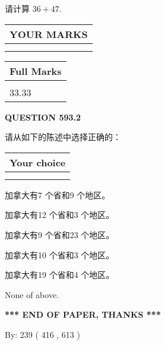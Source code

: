 \documentclass{ctexart}
\begin{document}
  
 
请计算 $ %
36 +  %
47 $.
 

 

 
  
\vspace{0.2in}
  
\noindent\begin{tabular}{|l|}
\hline
 YOUR MARKS  \\
\hline
 \\ 
 \\ 
\hline
\end{tabular}
\hspace{0.05in} \begin{tabular}{|l|}
\hline
 Full Marks  \\
\hline
 \\ 
33.33 \\
\hline
\end{tabular}
{\textbf{\Large{QUESTION
593.2 
}}}
  
  
请从如下的陈述中选择正确的：
  
  
\noindent\hspace{3.0in} \begin{tabular}{|l|}
\hline
Your choice \\
\hline
 \\ 
 \\ 
\hline
\end{tabular}
  
  
 
 
加拿大有7 个省和9 个地区。
 
 
加拿大有12 个省和3 个地区。
 
 
加拿大有9 个省和23 个地区。
 
 
加拿大有10 个省和3 个地区。
 
 
加拿大有19 个省和4 个地区。
 
 
 None of above.
 
 
   
   
 \vspace{0.2in}
 
   
   
   
   
\vspace{1.0in} 
{\textbf{\large{ *** END OF PAPER, THANKS *** }}} 
   
   
\hspace{1.0in} By: 
 239 ( 416 ,  613 )
   
\end{document}
